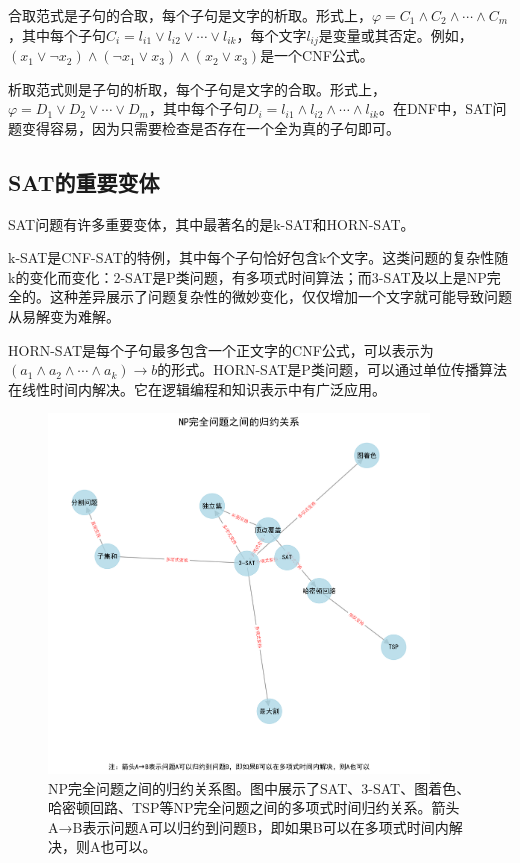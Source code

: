 \documentclass[a4paper,12pt]{ctexart}
\begin{document}
合取范式是子句的合取，每个子句是文字的析取。形式上，$\varphi = C_1 \wedge C_2 \wedge \cdots \wedge C_m$，其中每个子句$C_i = l_{i1} \vee l_{i2} \vee \cdots \vee l_{ik}$，每个文字$l_{ij}$是变量或其否定。例如，$(x_1 \vee \neg x_2) \wedge (\neg x_1 \vee x_3) \wedge (x_2 \vee x_3)$是一个CNF公式。

析取范式则是子句的析取，每个子句是文字的合取。形式上，$\varphi = D_1 \vee D_2 \vee \cdots \vee D_m$，其中每个子句$D_i = l_{i1} \wedge l_{i2} \wedge \cdots \wedge l_{ik}$。在DNF中，SAT问题变得容易，因为只需要检查是否存在一个全为真的子句即可。

\subsection{SAT的重要变体}
SAT问题有许多重要变体，其中最著名的是k-SAT和HORN-SAT。

k-SAT是CNF-SAT的特例，其中每个子句恰好包含k个文字。这类问题的复杂性随k的变化而变化：2-SAT是P类问题，有多项式时间算法；而3-SAT及以上是NP完全的。这种差异展示了问题复杂性的微妙变化，仅仅增加一个文字就可能导致问题从易解变为难解。

HORN-SAT是每个子句最多包含一个正文字的CNF公式，可以表示为$(a_1 \wedge a_2 \wedge \cdots \wedge a_k) \rightarrow b$的形式。HORN-SAT是P类问题，可以通过单位传播算法在线性时间内解决。它在逻辑编程和知识表示中有广泛应用。

\begin{figure}[H]
    \centering
    \includegraphics[width=0.9\textwidth]{img/np_reductions.png}
    \caption{NP完全问题之间的归约关系图。图中展示了SAT、3-SAT、图着色、哈密顿回路、TSP等NP完全问题之间的多项式时间归约关系。箭头A→B表示问题A可以归约到问题B，即如果B可以在多项式时间内解决，则A也可以。}
    \label{fig:np_reductions}
\end{figure}
\end{document}
